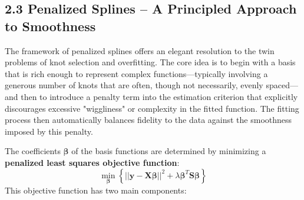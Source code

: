 \documentclass[11pt, a4paper]{article}
\begin{document}
\subsection{2.3 Penalized Splines – A Principled Approach to Smoothness}
The  framework of penalized splines offers an elegant resolution to the twin problems of knot selection and overfitting. The core idea is to begin with a basis that is rich enough to represent complex functions—typically involving a generous number of knots that are often, though not necessarily, evenly spaced—and then to introduce a penalty term into the estimation criterion that explicitly discourages excessive "wiggliness" or complexity in the fitted function. The fitting process then automatically balances fidelity to the data against the smoothness imposed by this penalty.

The coefficients $\boldsymbol{\beta}$ of the basis functions are determined by minimizing a \textbf{penalized least squares objective function}:
\[ \min_{\boldsymbol{\beta}} \left\{ ||\mathbf{y} - \mathbf{X}\boldsymbol{\beta}||^2 + \lambda \boldsymbol{\beta}^T \mathbf{S} \boldsymbol{\beta} \right\} \]
This objective function has two main components:
\end{document}
